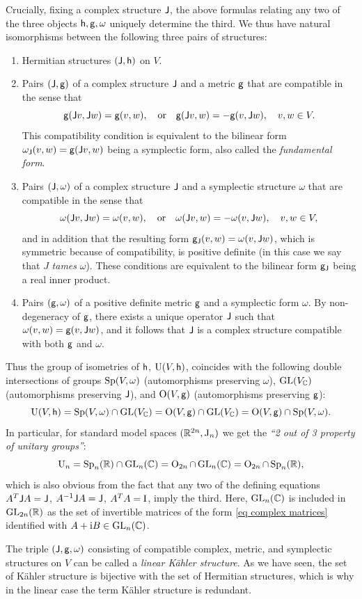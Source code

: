 \begin{example}
    Crucially, fixing a complex structure $\mathsf{J}$, the above formulas relating any two of the three objects $\mathsf{h},\mathsf{g},\omega$ uniquely determine the third. We thus have natural isomorphisms between the following three pairs of structures:
    \begin{enumerate}
        \item Hermitian structures $(\mathsf{J},\mathsf{h})$ on $V$.
        \item Pairs $(\mathsf{J},\mathsf{g})$ of a complex structure $\mathsf{J}$ and a metric $\mathsf{g}$ that are compatible in the sense that
        \[\mathsf{g}(\mathsf{J} v,\mathsf{J} w)=\mathsf{g}(v,w),\quad \text{or}\quad \mathsf{g}(\mathsf{J} v,w)=-\mathsf{g}(v,\mathsf{J} w),\quad v,w\in V.\]
        This compatibility condition is equivalent to the bilinear form $\omega_{\mathsf{J}}(v,w)=\mathsf{g}(\mathsf{J} v,w)$ being a symplectic form, also called the \emph{fundamental form}.
        \item Pairs $(\mathsf{J},\omega)$ of a complex structure $\mathsf{J}$ and a symplectic structure $\omega$ that are compatible in the sense that
        \[\omega(\mathsf{J} v,\mathsf{J} w)=\omega(v,w),\quad \text{or}\quad \omega(\mathsf{J} v,w)=-\omega(v,\mathsf{J} w),\quad v,w\in V,\]
        and in addition that the resulting form $\mathsf{g}_{\mathsf{J}}(v,w)=\omega(v,\mathsf{J} w)$, which is symmetric because of compatibility, is positive definite (in this case we say that $J$ \emph{tames} $\omega$). These conditions are equivalent to the bilinear form $\mathsf{g}_{\mathsf{J}}$ being a real inner product.
        \item Pairs $(\mathsf{g},\omega)$ of a positive definite metric $\mathsf{g}$ and a symplectic form $\omega$. By non-degeneracy of $\mathsf{g}$, there exists a unique operator $\mathsf{J}$ such that $\omega(v,w)=\mathsf{g}(v,\mathsf{J} w)$, and it follows that $\mathsf{J}$ is a complex structure compatible with both $\mathsf{g}$ and $\omega$.
    \end{enumerate}
    Thus the group of isometries of $\mathsf{h}$, $\operatorname{U}(V,\mathsf{h})$, coincides with the following double intersections of groups $\operatorname{Sp}(V,\omega)$ (automorphisms preserving $\omega$), $\operatorname{GL}(V_{\mathbb{C}})$ (automorphisms preserving $\mathsf{J}$), and $\operatorname{O}(V,\mathsf{g})$ (automorphisms preserving $\mathsf{g}$):
    \[\operatorname{U}(V,\mathsf{h})=\operatorname{Sp}(V,\omega)\cap \operatorname{GL}(V_{\mathbb{C}})=\operatorname{O}(V,\mathsf{g})\cap \operatorname{GL}(V_{\mathbb{C}})=\operatorname{O}(V,\mathsf{g})\cap \operatorname{Sp}(V,\omega).\]
    In particular, for standard model spaces $(\mathbb{R}^{2n},\mathrm{J}_{n})$ we get the \emph{``2 out of 3 property of unitary groups''}:
    \[\operatorname{U}_n=\operatorname{Sp}_n(\mathbb{R})\cap \operatorname{GL}_n(\mathbb{C})=\operatorname{O}_{2n}\cap \operatorname{GL}_n(\mathbb{C})=\operatorname{O}_{2n}\cap \operatorname{Sp}_n(\mathbb{R}),\]
    which is also obvious from the fact that any two of the defining equations $A^T\mathsf{J} A=\mathsf{J}$, $A^{-1}\mathsf{J} A= \mathsf{J}$, $A^TA=\mathrm{I}$, imply the third.
    Here, $\operatorname{GL}_n(\mathbb{C})$ is included in $\operatorname{GL}_{2n}(\mathbb{R})$ as the set of invertible matrices of the form \eqref{eq complex matrices} identified with $A+\mathrm{i} B\in \operatorname{GL}_n(\mathbb{C})$.
    
    The triple $(\mathsf{J},\mathsf{g},\omega)$ consisting of compatible complex, metric, and symplectic structures on $V$ can be called a \emph{linear K\"ahler structure}. As we have seen, the set of K\"ahler structure is bijective with the set of Hermitian structures, which is why in the linear case the term K\"ahler structure is redundant.
\end{example}

